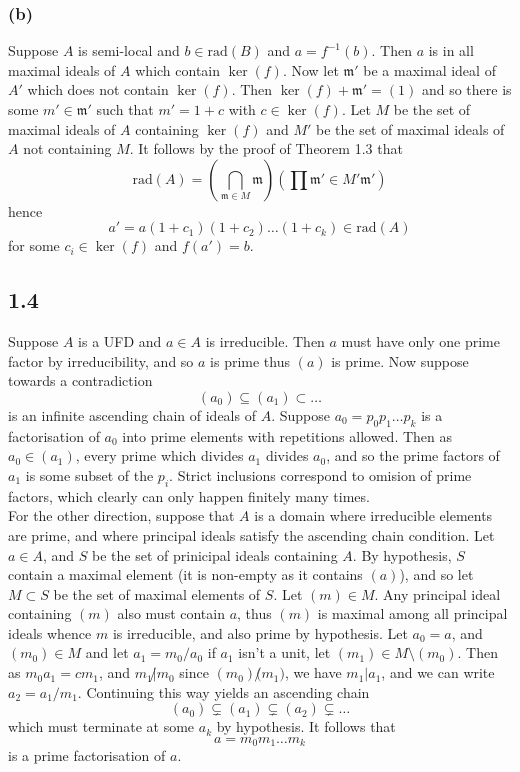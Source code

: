 \documentclass{article}
\theoremstyle{definition}
\newcommand{\rad}{\text{rad}}
\begin{document}
\subsubsection*{(b)}

Suppose $A$ is semi-local and $b \in \rad(B)$ and $a = f^{-1}(b)$. Then $a$ is
in all maximal ideals of $A$ which contain $\ker(f)$. Now let $\mathfrak{m}'$
be a maximal ideal of $A'$ which does not contain $\ker(f)$. Then $\ker(f) +
\mathfrak{m}' = (1)$ and so there is some $m' \in \mathfrak{m}'$ such that $m'
= 1 + c$ with $c \in \ker(f)$. Let $M$ be the set of maximal ideals of $A$
containing $\ker(f)$ and $M'$ be the set of maximal ideals of $A$ not
containing $M$. It follows by the proof of Theorem 1.3 that
\[
	\rad(A)
	=
	\left(
		\bigcap_{\mathfrak{m} \in M} \mathfrak{m}
	\right)	
	\left(
		\prod{\mathfrak{m}' \in M'} \mathfrak{m}'
	\right)
\] 
hence 
\[
	a' = a(1 + c_1)(1 + c_2) \ldots (1 + c_k) \in \rad(A)
\] 
for some $c_i \in \ker(f)$ and $f(a') = b$.

\subsection*{1.4}

Suppose $A$ is a UFD and $a \in A$ is irreducible. Then $a$ must have only one
prime factor by irreducibility, and so $a$ is prime thus $(a)$ is prime. Now 
suppose towards a contradiction
\[
	(a_0) \subseteq (a_1) \subset \ldots
\] 
is an infinite ascending chain of ideals of $A$. Suppose $a_0 = p_0p_1\ldots
p_k$ is a factorisation of $a_0$ into prime elements with repetitions allowed.
Then as $a_0 \in (a_1)$, every prime which divides $a_1$ divides $a_0$, and so
the prime factors of $a_1$ is some subset of the $p_i$. Strict inclusions
correspond to omision of prime factors, which clearly can only happen finitely
many times. \\

For the other direction, suppose that $A$ is a domain where irreducible
elements are prime, and where principal ideals satisfy the ascending chain
condition. Let $a \in A$, and $S$ be the set of prinicipal ideals containing
$A$. By hypothesis, $S$ contain a maximal element (it is non-empty as it
contains $(a)$), and so let $M \subset S$ be the set of maximal elements of
$S$. Let $(m) \in M$. Any principal ideal containing $(m)$ also must contain
$a$, thus $(m)$ is maximal among all principal ideals whence $m$ is
irreducible, and also prime by hypothesis. Let $a_0 = a$, and $(m_0) \in M$
and let $a_1 = m_0/a_0$ if $a_1$ isn't a unit, let $(m_1) \in M \setminus (m_0)$.
Then as $m_0 a_1 = c m_1$, and $m_1 \not | m_0$ since $(m_0) \not (m_1)$,
we have $m_1 | a_1$, and we can write $a_2 = a_1/m_1$. Continuing this way
yields an ascending chain
\[
	(a_0) \subsetneq (a_1) \subsetneq (a_2) \subsetneq \ldots
\] 
which must terminate at some $a_k$ by hypothesis. It follows that 
\[
	a = m_0 m_1 \ldots m_k
\] 
is a prime factorisation of $a$.
\end{document}
